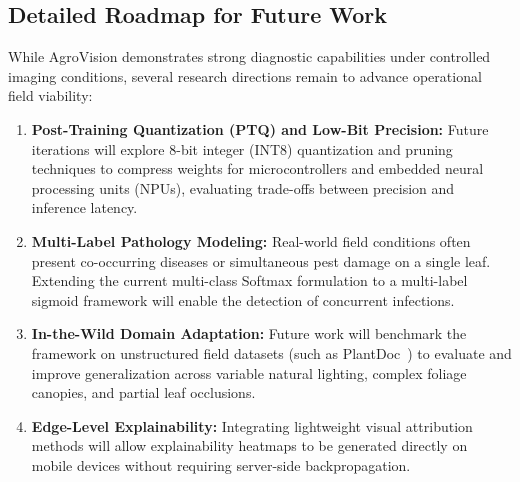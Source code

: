 \documentclass[journal]{IEEEtran}
\begin{document}
\subsection{Detailed Roadmap for Future Work}
While AgroVision demonstrates strong diagnostic capabilities under controlled imaging conditions, several research directions remain to advance operational field viability:
\begin{enumerate}
    \item \textbf{Post-Training Quantization (PTQ) and Low-Bit Precision:} Future iterations will explore 8-bit integer (INT8) quantization and pruning techniques to compress weights for microcontrollers and embedded neural processing units (NPUs), evaluating trade-offs between precision and inference latency.
    \item \textbf{Multi-Label Pathology Modeling:} Real-world field conditions often present co-occurring diseases or simultaneous pest damage on a single leaf. Extending the current multi-class Softmax formulation to a multi-label sigmoid framework will enable the detection of concurrent infections.
    \item \textbf{In-the-Wild Domain Adaptation:} Future work will benchmark the framework on unstructured field datasets (such as PlantDoc~\cite{singh2020}) to evaluate and improve generalization across variable natural lighting, complex foliage canopies, and partial leaf occlusions.
    \item \textbf{Edge-Level Explainability:} Integrating lightweight visual attribution methods will allow explainability heatmaps to be generated directly on mobile devices without requiring server-side backpropagation.
\end{enumerate}
\end{document}
